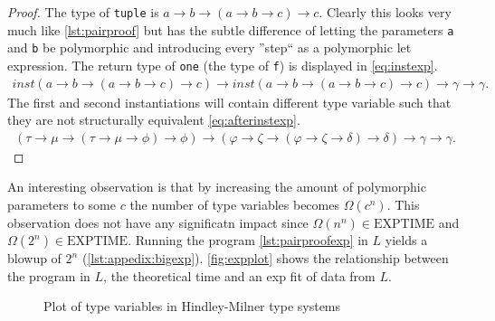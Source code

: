 \documentclass[11pt,oneside,a4paper]{report}
\begin{document}
\begin{proof}
    The type of \texttt{tuple} is $a \rightarrow b \rightarrow (a \rightarrow b \rightarrow c) \rightarrow c$.
    Clearly this looks very much like \autoref{lst:pairproof} but has the subtle difference of letting the parameters \texttt{a} and \texttt{b} be polymorphic and introducing every ''step`` as a polymorphic let expression.
    The return type of \texttt{one} (the type of \texttt{f}) is displayed in \autoref{eq:instexp}.
    \begin{align}
        \textit{inst}(a \rightarrow b \rightarrow (a \rightarrow b \rightarrow c) \rightarrow c) \rightarrow \textit{inst}(a \rightarrow b \rightarrow (a \rightarrow b \rightarrow c) \rightarrow c) \rightarrow \gamma \rightarrow \gamma.
        \label{eq:instexp}
    \end{align}
    The first and second instantiations will contain different type variable such that they are not structurally equivalent \autoref{eq:afterinstexp}.
    \begin{align}
        (\tau \rightarrow \mu \rightarrow (\tau \rightarrow \mu \rightarrow \phi) \rightarrow \phi) \rightarrow (\varphi \rightarrow \zeta \rightarrow (\varphi \rightarrow \zeta \rightarrow \delta) \rightarrow \delta) \rightarrow \gamma \rightarrow \gamma.
        \label{eq:afterinstexp}
    \end{align}
\end{proof}
An interesting observation is that by increasing the amount of polymorphic parameters to some $c$ the number of type variables becomes $\Omega(c^n)$.
This observation does not have any significatn impact since $\Omega(n^n) \in \text{EXPTIME}$ and $\Omega(2^n) \in \text{EXPTIME}$.
Running the program \autoref{lst:pairproofexp} in $L$ yields a blowup of $2^n$ (\autoref{lst:appedix:bigexp}).
\autoref{fig:expplot} shows the relationship between the program in $L$, the theoretical time and an exp fit of data from $L$.
\begin{figure}[ht]
    \centering
{}
    \caption{Plot of type variables in Hindley-Milner type systems}
    \label{fig:expplot}
\end{figure}
\end{document}
